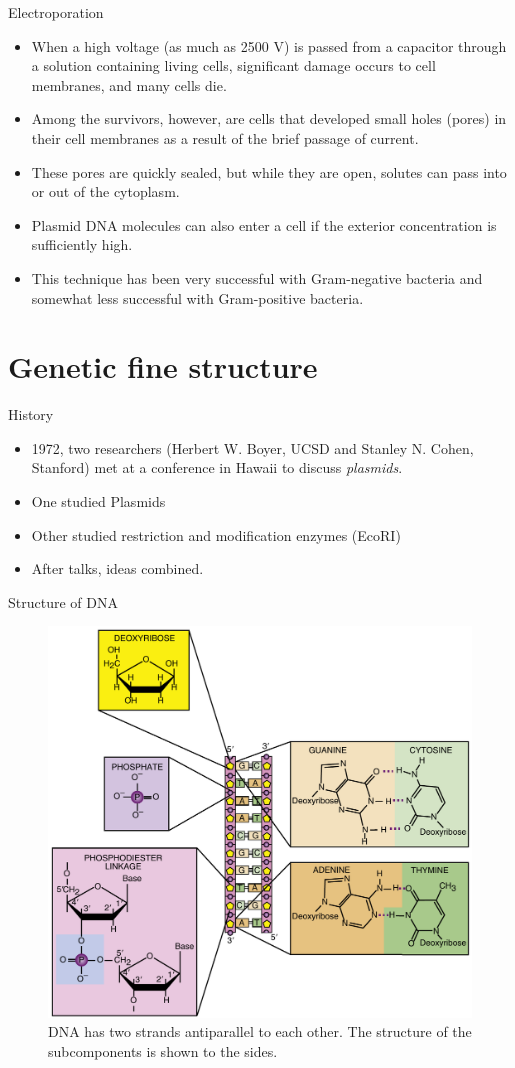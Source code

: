 \documentclass[
  ignorenonframetext,
  aspectratio=169]{beamer}
\providecommand{\tightlist}{%
  \setlength{\itemsep}{0pt}\setlength{\parskip}{0pt}}
\begin{document}
\begin{frame}{Electroporation}
\protect\hypertarget{electroporation}{}
\begin{itemize}
\tightlist
\item
  When a high voltage (as much as 2500 V) is passed from a capacitor
  through a solution containing living cells, significant damage occurs
  to cell membranes, and many cells die.
\item
  Among the survivors, however, are cells that developed small holes
  (pores) in their cell membranes as a result of the brief passage of
  current.
\item
  These pores are quickly sealed, but while they are open, solutes can
  pass into or out of the cytoplasm.
\item
  Plasmid DNA molecules can also enter a cell if the exterior
  concentration is sufficiently high.
\item
  This technique has been very successful with Gram-negative bacteria
  and somewhat less successful with Gram-positive bacteria.
\end{itemize}
\end{frame}

\hypertarget{genetic-fine-structure}{%
\section{Genetic fine structure}\label{genetic-fine-structure}}

\begin{frame}{History}
\protect\hypertarget{history}{}
\begin{itemize}
\tightlist
\item
  1972, two researchers (Herbert W. Boyer, UCSD and Stanley N. Cohen,
  Stanford) met at a conference in Hawaii to discuss \emph{plasmids}.
\item
  One studied Plasmids
\item
  Other studied restriction and modification enzymes (EcoRI)
\item
  After talks, ideas combined.
\end{itemize}
\end{frame}

\begin{frame}{Structure of DNA}
\protect\hypertarget{structure-of-dna}{}
\begin{figure}
\includegraphics[width=0.45\linewidth]{./../images/dna_structure_a} \caption{DNA has two strands antiparallel to each other. The structure of the subcomponents is shown to the sides.}\label{fig:nucleic-acid-dna}
\end{figure}
\end{frame}
\end{document}
